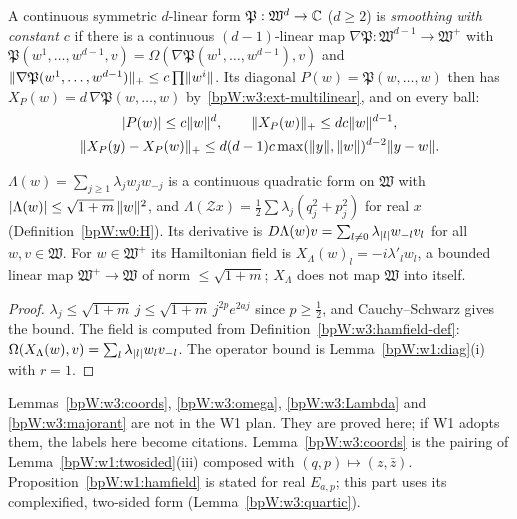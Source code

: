 \begin{definition}\label{bpW:w3:forms}
A continuous symmetric $d$-linear form $\mathfrak P:\mathfrak W^d\to\mathbb{C}$ ($d\ge2$) is \emph{smoothing with constant
$c$} if there is a continuous $(d-1)$-linear map $\nabla\mathfrak P:\mathfrak W^{d-1}\to\mathfrak W^+$ with
$\mathfrak P(w^1,\dots,w^{d-1},v)=\Omega(\nabla\mathfrak P(w^1,\dots,w^{d-1}),v)$ and
$\lVert \nabla\mathfrak P(w^1,\dots,w^{d-1})\rVert_+\le c\prod\lVert w^i\rVert$. Its diagonal $P(w)=\mathfrak P(w,\dots,w)$ then
has $X_P(w)=d\,\nabla\mathfrak P(w,\dots,w)$ by~\ref{bpW:w3:ext-multilinear}, and on every ball:
\begin{gather*}\lvert P(w)\rvert\le c\lVert w\rVert^d,\qquad\lVert X_P(w)\rVert_+\le dc\lVert w\rVert^{d-1},\\
\lVert X_P(y)-X_P(w)\rVert_+\le d(d-1)c\max(\lVert y\rVert,\lVert w\rVert)^{d-2}\lVert y-w\rVert.\end{gather*}
\end{definition}

\begin{lemma}\label{bpW:w3:Lambda}
$\Lambda(w)=\sum_{j\ge1}\lambda_jw_jw_{-j}$ is a continuous quadratic form on $\mathfrak W$ with
$\lvert \Lambda(w)\rvert\le\sqrt{1+m}\,\lVert w\rVert^2$, and $\Lambda(\mathcal Zx)=\frac12\sum\lambda_j(q_j^2+p_j^2)$ for real $x$
(Definition~\ref{bpW:w0:H}). Its derivative is $D\Lambda(w)v=\sum_{l\ne0}\lambda_{\lvert l\rvert}w_{-l}v_l$ for all
$w,v\in\mathfrak W$. For $w\in\mathfrak W^+$ its Hamiltonian field is $X_\Lambda(w)_l=-i\lambda'_lw_l$, a bounded
linear map $\mathfrak W^+\to\mathfrak W$ of norm $\le\sqrt{1+m}$; $X_\Lambda$ does not map $\mathfrak W$ into itself.
\end{lemma}

\begin{proof}
$\lambda_j\le\sqrt{1+m}\,j\le\sqrt{1+m}\,j^{2p}e^{2aj}$ since $p\ge\frac12$, and Cauchy--Schwarz gives the bound. The
field is computed from Definition~\ref{bpW:w3:hamfield-def}: $\Omega(X_\Lambda(w),v)=\sum_l\lambda_{\lvert l\rvert}w_lv_{-l}$.
The operator bound is Lemma~\ref{bpW:w1:diag}(i) with $r=1$.
\end{proof}

\begin{remark}[Requests to W1]\label{bpW:w3:w1-requests}
Lemmas~\ref{bpW:w3:coords}, \ref{bpW:w3:omega}, \ref{bpW:w3:Lambda} and \ref{bpW:w3:majorant} are not in the W1 plan.
They are proved here; if W1 adopts them, the labels here become citations. Lemma~\ref{bpW:w3:coords} is the
pairing of Lemma~\ref{bpW:w1:twosided}(iii) composed with $(q,p)\mapsto(z,\bar z)$. Proposition~\ref{bpW:w1:hamfield}
is stated for real $E_{a,p}$; this part uses its complexified, two-sided form (Lemma~\ref{bpW:w3:quartic}).
\end{remark}

